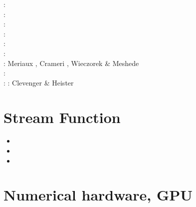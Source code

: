 \begin{scriptsize}
\twothousandtwelve: \cite{crsg12}\cite{chgv12}\cite{krwd12}\cite{may12}\cite{gerb12}\cite{asmo12}\\
\twothousandthirteen: \cite{chtl13}\cite{kemk13}\cite{gemd13}\cite{hutm13}\\
\twothousandfourteen: \cite{thmk14}\cite{mabl14}\cite{lopp14}\cite{stlh14}\\
\twothousandfifteen: \cite{lelk15}\cite{rumi15}\cite{chpe15}\cite{mabl15}\\
\twothousandsixteen: \cite{dumy16}\cite{blmp16}\\
\twothousandseventeen: \cite{robh17}\cite{wisv17}\cite{majc17}\\
\twothousandeighteen: Meriaux \etal \cite{memm18}, Crameri \cite{cram18}, Wieczorek \& Meshede \cite{wime18}\\
\twothousandnineteen: \cite{liki19}\cite{demh19}\cite{galb19}\cite{frtv19}\cite{yuwa19}\cite{ropu19}\\
\twothousandtwenty: \cite{homb20}\cite{trlb20}\cite{gadb20}\cite{jaca20a,jaca20b} 
\twothousandtwentyone: Clevenger \& Heister \cite{clhe21}
\end{scriptsize}




\section{Stream Function} 

\begin{scriptsize}
\begin{itemize}
\item[\nineteeneightynine]
\item[\nineteenninetysix] 
\item[\nineteenninetynine] 
\end{itemize}
\end{scriptsize}

\section{Numerical hardware, GPU}
\label{sec:topics:hardware}

